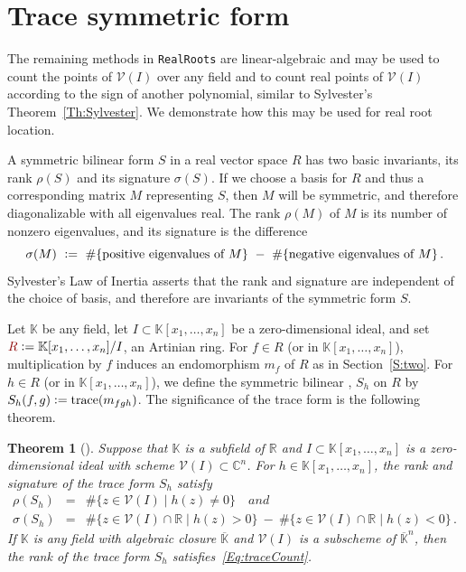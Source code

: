 \documentclass[12pt]{amsart}
\newtheorem{theorem}{Theorem}
\theoremstyle{definition}
\newcommand{\CC}{\mathbb{C}}
\newcommand{\RR}{\mathbb{R}}
\newcommand{\KK}{\mathbb{K}}
\newcommand{\calV}{\mathcal{V}}
\newcommand{\defcolor}[1]{{\color{TAMU}#1}}
\newcommand{\demph}[1]{\defcolor{{\sl #1}}}
\begin{document}
\section{Trace symmetric form}\label{S:three}
%
%
The remaining methods in \texttt{RealRoots} are linear-algebraic and may be used to count the points of $\calV(I)$ over any
field and to count real points of $\calV(I)$ according to 
the sign of another polynomial, similar to Sylvester's Theorem~\ref{Th:Sylvester}.
We demonstrate how this may be used for real root location.

A symmetric bilinear form \defcolor{$S$} in a real vector space $R$ has two basic invariants, its rank \defcolor{$\rho(S)$} and its signature
\defcolor{$\sigma(S)$}.
If we choose a basis for $R$ and thus a corresponding matrix $M$ representing $S$, then $M$ will be symmetric, and therefore 
diagonalizable with all eigenvalues real.
The rank $\rho(M)$ of $M$ is its number of nonzero eigenvalues, and its signature  is the difference
\[
\sigma(M)\ \vcentcolon =\ \#\{\mbox{positive eigenvalues of $M$}\}
\ -\ \#\{\mbox{negative eigenvalues of $M$}\}\,.
\]
Sylvester's Law of Inertia asserts that the rank and signature are independent of the choice of basis, and therefore are invariants of the
symmetric form $S$.

Let $\KK$ be any field, let $I\subset\KK[x_1,\dotsc,x_n]$ be a zero-dimensional ideal, and set
$\defcolor{R}\vcentcolon=\KK[x_1,\dotsc,x_n]/I$, an  Artinian ring.    
For $f\in R$ (or in $\KK[x_1,\dotsc,x_n]$), multiplication by $f$ induces an endomorphism $m_f$ of $R$ as in Section~\ref{S:two}.
For $h\in R$ (or in $\KK[x_1,\dotsc,x_n]$), we define the symmetric bilinear \demph{trace form}, \defcolor{$S_h$} on $R$ by
$S_h(f,g)\vcentcolon= \mbox{trace}(m_{fgh})$.
The significance of the trace form is the following theorem.

\begin{theorem}[]
  Suppose that $\KK$ is a subfield of $\RR$ and $I\subset\KK[x_1,\dotsc,x_n]$ is a zero-dimensional ideal with scheme
  $\calV(I)\subset\CC^n$.
  For $h\in\KK[x_1,\dotsc,x_n]$, the rank and signature of the trace form $S_h$ satisfy
  \begin{eqnarray}
    \rho(S_h)&=&    \label{Eq:traceCount}
      \#\{ z \in \calV(I) \mid h(z)\neq 0\} \quad and  \\
    \sigma(S_h)&=&
        \#\{ z \in \calV(I)\cap\RR \mid h(z)> 0\} \ -\  \nonumber
        \#\{ z \in \calV(I)\cap\RR \mid h(z)< 0\} \,.
  \end{eqnarray}
  If $\KK$ is any field with algebraic closure $\overline{\KK}$ and $\calV(I)$ is a subscheme of $\overline{\KK}^n$, then 
  the rank of the trace form $S_h$ satisfies~\eqref{Eq:traceCount}.
\end{theorem}
\end{document}

